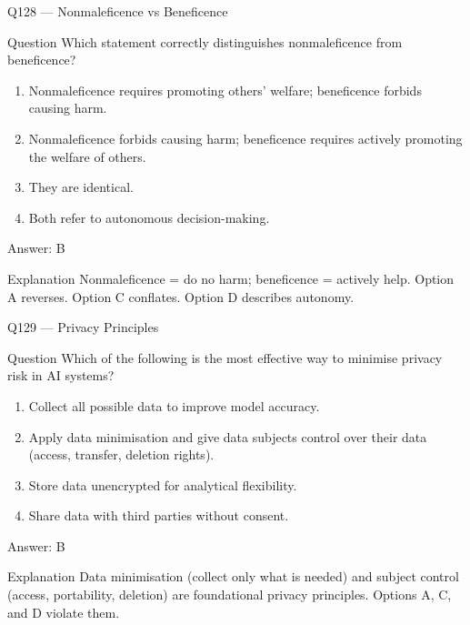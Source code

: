 \documentclass[aspectratio=169,8pt]{beamer}
\begin{document}
\begin{frame}{Q128 --- Nonmaleficence vs Beneficence}
\begin{block}{Question}
Which statement correctly distinguishes nonmaleficence from beneficence?
\begin{enumerate}
\item Nonmaleficence requires promoting others' welfare; beneficence forbids causing harm.
\item Nonmaleficence forbids causing harm; beneficence requires actively promoting the welfare of others.
\item They are identical.
\item Both refer to autonomous decision-making.
\end{enumerate}
	\end{block}
\begin{exampleblock}{Answer: B}\end{exampleblock}
\begin{block}{Explanation}
Nonmaleficence = do no harm; beneficence = actively help. Option A reverses. Option C conflates. Option D describes autonomy.
\end{block}
\end{frame}

\begin{frame}{Q129 --- Privacy Principles}
\begin{block}{Question}
Which of the following is the most effective way to minimise privacy risk in AI systems?
\begin{enumerate}
\item Collect all possible data to improve model accuracy.
\item Apply data minimisation and give data subjects control over their data (access, transfer, deletion rights).
\item Store data unencrypted for analytical flexibility.
\item Share data with third parties without consent.
\end{enumerate}
	\end{block}
\begin{exampleblock}{Answer: B}\end{exampleblock}
\begin{block}{Explanation}
Data minimisation (collect only what is needed) and subject control (access, portability, deletion) are foundational privacy principles. Options A, C, and D violate them.
\end{block}
\end{frame}
\end{document}
